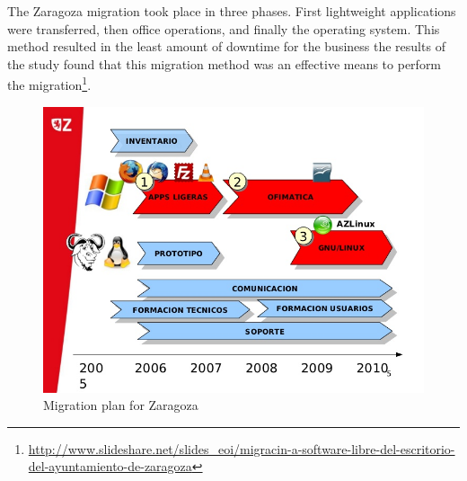   The Zaragoza migration took place in three phases. First lightweight applications were transferred, then office operations, and finally the operating system. This method resulted in the least amount of downtime for the business the results of the study found that this migration method was an effective means to perform the migration\footnote{\url{http://www.slideshare.net/slides\_eoi/migracin-a-software-libre-del-escritorio-del-ayuntamiento-de-zaragoza}}.

 \begin{figure}[H]
 \centering
     \includegraphics[scale=0.5]{img/desktopplan.jpg} 
  \caption[Migration plan in Zaragoza]{Migration plan for Zaragoza \protect\footnotemark}   
     \label {fig:plan-Zara}
     \end{figure}
     
